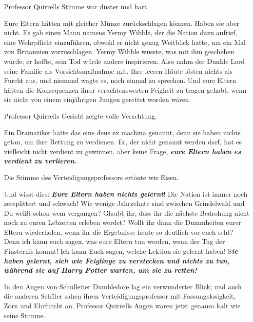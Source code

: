 Professor Quirrells Stimme war düster und hart.

\glqq{}Eure Eltern hätten mit gleicher Münze zurückschlagen können. Haben sie
aber nicht. Es gab einen Mann namens Yermy Wibble, der die Nation dazu aufrief,
eine Wehrpflicht einzuführen, obwohl er nicht genug Weitblick hatte, um ein Mal
von Britannien vorzuschlagen. Yermy Wibble wusste, was mit ihm geschehen würde;
er hoffte, sein Tod würde andere inspirieren. Also nahm der Dunkle Lord seine
Familie als Vorsichtsmaßnahme mit. Ihre leeren Häute lösten nichts als Furcht
aus, und niemand wagte es, noch einmal zu sprechen. Und eure Eltern hätten die
Konsequenzen ihrer verachtenswerten Feigheit zu tragen gehabt, wenn sie nicht
von einem einjährigen Jungen gerettet worden wären.\grqq{}

Professor Quirrells Gesicht zeigte volle Verachtung.

\glqq{}Ein Dramatiker hätte das eine deus ex machina genannt, denn sie haben
nichts getan, um ihre Rettung zu verdienen. Er, der nicht genannt werden darf,
hat es vielleicht nicht verdient zu gewinnen, aber keine Frage,
\textbf{\emph{eure Eltern haben es verdient zu verlieren.}}\grqq{}

Die Stimme des Verteidigungsprofessors ertönte wie Eisen.

\glqq{}Und wisst dies: \textbf{\emph{Eure Eltern haben nichts gelernt}}! Die
Nation ist immer noch zersplittert und schwach! Wie wenige Jahrzehnte sind
zwischen Grindelwald und Du-weißt-schon-wem vergangen? Glaubt ihr, dass ihr die
nächste Bedrohung nicht noch zu euren Lebzeiten erleben werdet? Wollt ihr dann
die Dummheiten eurer Eltern wiederholen, wenn ihr die Ergebnisse heute so
deutlich vor euch seht? Denn ich kann euch sagen, was eure Eltern tun werden,
wenn der Tag der Finsternis kommt! Ich kann Euch sagen, welche Lektion sie
gelernt haben! S\textbf{\emph{ie haben gelernt, sich wie Feiglinge zu verstecken
und nichts zu tun, während sie auf Harry Potter warten, um sie zu retten!}}\grqq{}

In den Augen von Schulleiter Dumbledore lag ein verwunderter Blick; und auch die
anderen Schüler sahen ihren Verteidigungsprofessor mit Fassungslosigkeit, Zorn
und Ehrfurcht an. Professor Quirrells Augen waren jetzt genauso kalt wie seine
Stimme.

